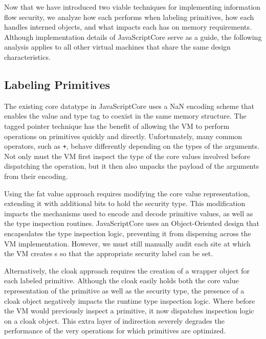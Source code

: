 Now that we have introduced two viable techniques for implementing information flow security, we analyze how each performs when labeling primitives, how each handles interned objects, and what impacts each has on memory requirements.
Although implementation details of JavaScriptCore serve as a guide, the following analysis applies to all other virtual machines that share the same design characteristics.

\subsection{Labeling Primitives}\label{sec:primitives}


The existing core datatype in JavaScriptCore uses a NaN encoding scheme that enables the value and type tag to coexist in the same memory structure.
The tagged pointer technique has the benefit of allowing the VM to perform operations on primitives quickly and directly.
Unfortunately, many common operators, such as \texttt{+}, behave differently depending on the types of the arguments.
Not only must the VM first inspect the type of the core values involved before dispatching the operation, but it then also unpacks the payload of the arguments from their encoding.

Using the fat value approach requires modifying the core value representation, extending it with additional bits to hold the security type.
This modification impacts the mechanisms used to encode and decode primitive values, as well as the type inspection routines.
JavaScriptCore uses an Object-Oriented design that encapsulates the type inspection logic, preventing it from dispersing across the VM implementation.
However, we must still manually audit each site at which the VM creates s so that the appropriate security label can be set.

Alternatively, the cloak approach requires the creation of a wrapper object for each labeled primitive.
Although the cloak easily holds both the core value representation of the primitive as well as the security type, the presence of a cloak object negatively impacts the runtime type inspection logic.
Where before the VM would previously inspect a primitive, it now dispatches inspection logic on a cloak object.
This extra layer of indirection severely degrades the performance of the very operations for which primitives are optimized.

